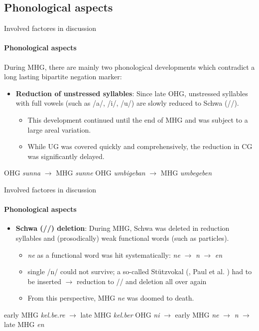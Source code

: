 \documentclass[xcolor=table, compress, %
handout
]{beamer}
\begin{document}
\subsection{Phonological aspects}

\begin{frame}{Involved factores in discussion}
\framesubtitle{Phonological aspects}

During MHG, there are mainly two phonological developments which contradict a long lasting bipartite negation marker:

\begin{itemize}
    \item \textbf{Reduction of unstressed syllables}: Since late OHG, unstressed syllables with full vowels (such as /a/, /i/, /u/) are slowly reduced to Schwa (//).
    \begin{itemize}
        \item This development continued until the end of MHG and was subject to a large areal variation.
        \item While UG was covered quickly and comprehensively, the reduction in CG was significantly delayed.
    \end{itemize}
\end{itemize}

\pex
\a
OHG \textit{sunna} $\rightarrow$ MHG \textit{sunne}
\a
OHG \textit{umbigeban} $\rightarrow$ MHG \textit{umbegeben}
\xe

\end{frame}

\begin{frame}{Involved factores in discussion}
\framesubtitle{Phonological aspects}

\begin{itemize}
    \item \textbf{Schwa (//) deletion}: During MHG, Schwa was deleted in reduction syllables and (prosodically) weak functional words (such as particles).
    \begin{itemize}
        \item \textit{ne} as a functional word was hit systematically: \textit{ne} $\rightarrow$ \textit{n} $\rightarrow$ \textit{en}
        \item single /n/ could not survive; a so-called \glqq Stützvokal\grqq{} (\citealt{Nuebling1992}, Paul et al. \citeyear{paul07}) had to be inserted $\rightarrow$ reduction to // and deletion all over again
        \item From this perspective, MHG \textit{ne} was doomed to death.
    \end{itemize}
\end{itemize}

\pex
\a
early MHG \textit{kel.be.re} $\rightarrow$ late MHG \textit{kel.ber}
\a
OHG \textit{ni} $\rightarrow$ early MHG \textit{ne} $\rightarrow$ \textit{n} $\rightarrow$ late MHG \textit{en}
\xe

\end{frame}
\end{document}
